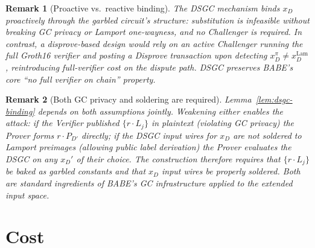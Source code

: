 \documentclass[11pt]{article}
\newtheorem{remark}{Remark}
\begin{document}
\begin{remark}[Proactive vs.\ reactive binding]
The DSGC mechanism binds $x_D$ proactively through the garbled
circuit's structure: substitution is infeasible without breaking GC
privacy or Lamport one-wayness, and no Challenger is required. In
contrast, a disprove-based design would rely on an active Challenger
running the full Groth16 verifier and posting a Disprove transaction
upon detecting $x_D^{\pi} \neq x_D^{\mathrm{Lam}}$, reintroducing
full-verifier cost on the dispute path. DSGC preserves BABE's core
``no full verifier on chain'' property.
\end{remark}

\begin{remark}[Both GC privacy and soldering are required]
Lemma~\ref{lem:dsgc-binding} depends on \emph{both} assumptions
jointly. Weakening either enables the attack: if the Verifier
published $\{r \cdot L_j\}$ in plaintext (violating GC privacy) the
Prover forms $r \cdot P_{D'}$ directly; if the DSGC input wires for
$x_D$ are not soldered to Lamport preimages (allowing public label
derivation) the Prover evaluates the DSGC on any $x_D'$ of their
choice. The construction therefore requires that $\{r \cdot L_j\}$
be baked as garbled constants \emph{and} that $x_D$ input wires be
properly soldered. Both are standard ingredients of BABE's GC
infrastructure applied to the extended input space.
\end{remark}

\section{Cost}\label{sec:cost}
\end{document}
